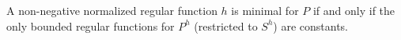 A non-negative normalized regular function $h$ is minimal for $P$ if and only if the only bounded regular functions for $P^h$ (restricted to $S^h$) are constants.
